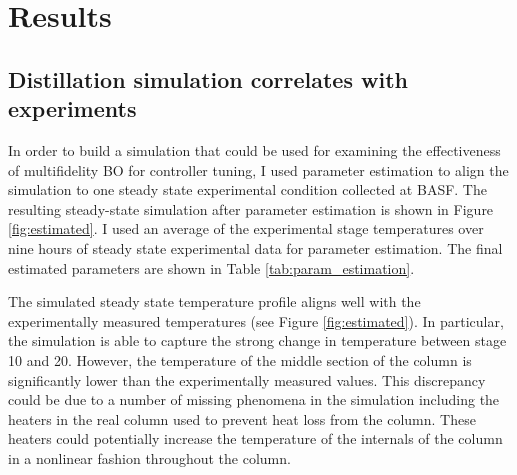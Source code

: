 
\section{Results}

\subsection{Distillation simulation correlates with experiments}

In order to build a simulation that could be used for examining the effectiveness of multifidelity BO for controller tuning, I used parameter estimation to align the simulation to one steady state experimental condition collected at BASF. The resulting steady-state simulation after parameter estimation is shown in Figure \ref{fig:estimated}. I used an average of the experimental stage temperatures over nine hours of steady state experimental data for parameter estimation. The final estimated parameters are shown in Table \ref{tab:param_estimation}.

The simulated steady state temperature profile aligns well with the experimentally measured temperatures (see Figure \ref{fig:estimated}). In particular, the simulation is able to capture the strong change in temperature between stage 10 and 20. However, the temperature of the middle section of the column is significantly lower than the experimentally measured values. This discrepancy could be due to a number of missing phenomena in the simulation including the heaters in the real column used to prevent heat loss from the column. These heaters could potentially increase the temperature of the internals of the column in a nonlinear fashion throughout the column. 

